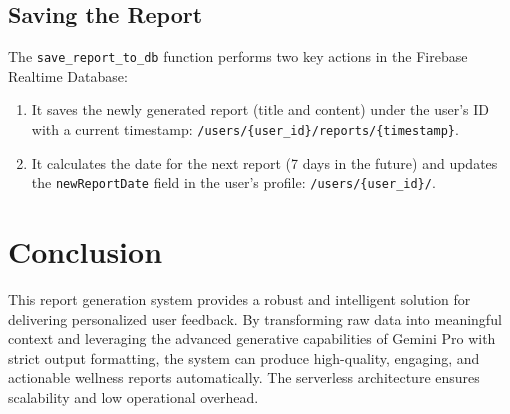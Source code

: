 \documentclass{article}
\begin{document}
\subsection{Saving the Report}
The \texttt{save\_report\_to\_db} function performs two key actions in the Firebase Realtime Database:
\begin{enumerate}[noitemsep]
    \item It saves the newly generated report (title and content) under the user's ID with a current timestamp: \texttt{/users/\{user\_id\}/reports/\{timestamp\}}.
    \item It calculates the date for the next report (7 days in the future) and updates the \texttt{newReportDate} field in the user's profile: \texttt{/users/\{user\_id\}/}.
\end{enumerate}

\hrulefill

\section{Conclusion}
This report generation system provides a robust and intelligent solution for delivering personalized user feedback. By transforming raw data into meaningful context and leveraging the advanced generative capabilities of Gemini Pro with strict output formatting, the system can produce high-quality, engaging, and actionable wellness reports automatically. The serverless architecture ensures scalability and low operational overhead.
\end{document}

